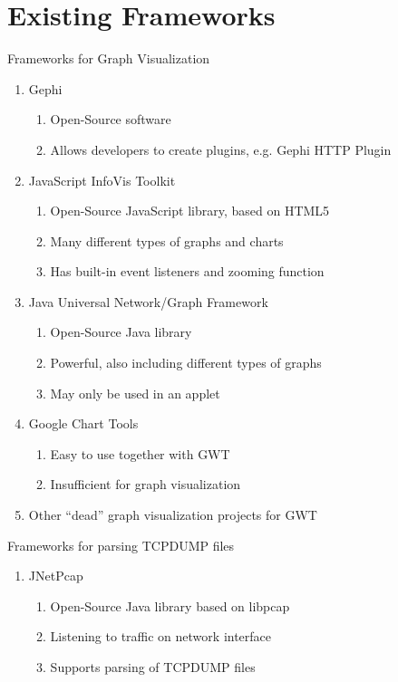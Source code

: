 \documentclass{beamer}
\begin{document}
\section{Existing Frameworks}

\begin{frame}{Frameworks for Graph Visualization}

  \begin{enumerate}
    \item Gephi
      \begin{enumerate}
	\item Open-Source software
	\item Allows developers to create plugins, e.g. Gephi HTTP Plugin
      \end{enumerate}
    \item JavaScript InfoVis Toolkit
      \begin{enumerate}
	\item Open-Source JavaScript library, based on HTML5
	\item Many different types of graphs and charts
	\item Has built-in event listeners and zooming function
      \end{enumerate}
    \item Java Universal Network/Graph Framework
      \begin{enumerate}
	\item Open-Source Java library
	\item Powerful, also including different types of graphs
	\item May only be used in an applet
      \end{enumerate}
    \item Google Chart Tools
      \begin{enumerate}
	\item Easy to use together with GWT
	\item Insufficient for graph visualization
      \end{enumerate}
     \item Other ``dead'' graph visualization projects for GWT
 \end{enumerate}
\end{frame}

\begin{frame}{Frameworks for parsing TCPDUMP files }
  \begin{enumerate}
   \item JNetPcap 
      \begin{enumerate}
	\item Open-Source Java library based on libpcap
	\item Listening to traffic on network interface
	\item Supports parsing of TCPDUMP files
      \end{enumerate}  
  \end{enumerate}
\end{frame}
\end{document}
